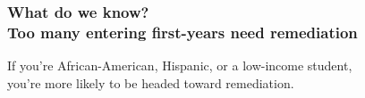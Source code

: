 \documentclass[13pt]{beamer}
\newcounter{a}
\newcounter{b}
\def\shadowradius{0.05\textwidth}
\def\zerodistance{1pt}
\newcommand\drawshadowbis[1]{
  \begin{pgfonlayer}{shadow}
    \fill[fill=white] ($(#1.south west)+(-\zerodistance,-\zerodistance)$) rectangle ($(#1.north east)+(\zerodistance,\zerodistance)$);

    \begin{scope}
      \clip ($(#1.south west)$) rectangle ++(-\shadowradius,-\shadowradius);
      \fill[fill=white,path fading=fade out]
        ($(#1.south west)$) circle (\shadowradius);
    \end{scope}

    \begin{scope}
      \clip ($(#1.south east)$) rectangle ++(\shadowradius,-\shadowradius);
      \fill[fill=white,path fading=fade out]
        ($(#1.south east)$) circle (\shadowradius);
    \end{scope}

    \begin{scope}
      \clip ($(#1.north west)$) rectangle ++(-\shadowradius,\shadowradius);
      \fill[fill=white,path fading=fade out]
        ($(#1.north west)$) circle (\shadowradius);
    \end{scope}

    \begin{scope}
      \clip ($(#1.north east)$) rectangle ++(\shadowradius,\shadowradius);
      \fill[fill=white,path fading=fade out]
        ($(#1.north east)$) circle (\shadowradius);
    \end{scope}

    \fill[path fading=fade up,fill=white] ($(#1.south west)+((0,-\shadowradius)$) rectangle ($(#1.south east)$);
    \fill[path fading=fade right,fill=white] ($(#1.south east)$) rectangle ($(#1.north east)+((\shadowradius,0)$);
    \fill[path fading=fade down,fill=white] ($(#1.north west)$) rectangle ($(#1.north east)+((0,\shadowradius)$);
    \fill[path fading=fade left,fill=white] ($(#1.south west)$) rectangle ($(#1.north west)+(-\shadowradius,0)$);
  \end{pgfonlayer}
}
\begin{document}
\begin{frame}
  \frametitle{What do we know? \\ Too many entering first-years need remediation}


  If you're African-American, Hispanic, or a low-income student, \\
  \quad you're more likely to be headed toward remediation.
\end{frame}
\end{document}
